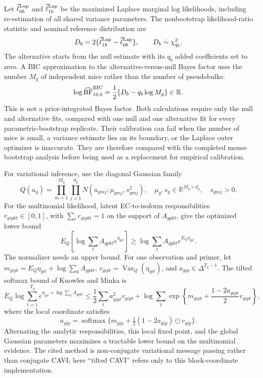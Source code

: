 \documentclass[11pt]{article}
\begin{document}
Let \(\widehat\ell^{\rm Lap}_{0b}\) and \(\widehat\ell^{\rm Lap}_{1b}\) be the maximized Laplace marginal log likelihoods, including re-estimation of all shared variance parameters. The nonbootstrap likelihood-ratio statistic and nominal reference distribution are \[
 D_b=2\{\widehat\ell^{\rm Lap}_{1b}
          -\widehat\ell^{\rm Lap}_{0b}\},
 \qquad D_b\mathrel{\dot\sim}\chi^2_{q_b}.
\]
The alternative starts from the null estimate with its \(q_b\) added coefficients set to zero. A BIC approximation to the alternative-versus-null Bayes factor uses the number \(M_g\) of independent mice rather than the number of pseudobulks: \[
 \log \widehat{\mathrm{BF}}_{10,b}^{\rm BIC}
 =\frac12\{D_b-q_b\log M_g\}\in\mathbb R.
\]
This is not a prior-integrated Bayes factor. Both calculations require only the null and alternative fits, compared with one null and one alternative fit for every parametric-bootstrap replicate. Their calibration can fail when the number of mice is small, a variance estimate lies on its boundary, or the Laplace outer optimizer is inaccurate. They are therefore compared with the completed mouse bootstrap analysis before being used as a replacement for empirical calibration.

For variational inference, use the diagonal Gaussian family \[
 Q(u_g)=\prod_{m=1}^{M_g}\prod_{j=1}^{d_g}
 N(u_{gmj};\mu_{gmj},s_{gmj}^2),
 \quad \mu_g,s_g\in\mathbb R^{M_g\times d_g},\quad s_{gmj}>0.
\]
For the multinomial likelihood, latent EC-to-isoform responsibilities \(r_{gipkt}\in[0,1]\), with \(\sum_t r_{gipkt}=1\) on the support of \(A_{gpkt}\), give the optimized lower bound \[
 E_Q\!\left[\log\sum_t A_{gpkt}e^{\eta_{git}}\right]
 \geq
 \log\sum_t A_{gpkt}e^{E_Q\eta_{git}}.
\]
The normalizer needs an upper bound. For one observation and primer, let \(m_{gipt}=E_Q\eta_{git}+\log\sum_kA_{gpkt}\), \(v_{gipt}=\operatorname{Var}_Q(\eta_{git})\), and \(a_{gip}\in\Delta^{T_g-1}\). The tilted softmax bound of Knowles and Minka is \[
 E_Q\log\sum_{t=1}^{T_g}e^{\eta_{git}+\log\sum_kA_{gpkt}}
 \leq \frac12\sum_ta_{gipt}^2v_{gipt}
 +\log\sum_t\exp\!\left\{
 m_{gipt}+\frac{1-2a_{gipt}}2v_{gipt}\right\},
\]
where the local coordinate satisfies \[
 a_{gip}=\operatorname{softmax}\{m_{gip}
 +\tfrac12(1-2a_{gip})\mathbin\odot v_{gip}\}.
\]
Alternating the analytic responsibilities, this local fixed point, and the global Gaussian parameters maximizes a tractable lower bound on the multinomial evidence. The cited method is non-conjugate variational message passing rather than conjugate CAVI; here ``tilted CAVI'' refers only to this block-coordinate implementation.
\end{document}
